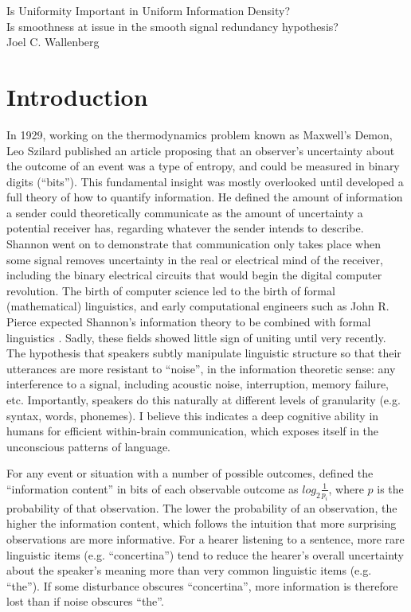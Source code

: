 \documentclass[12pt]{article}
\begin{document}
\noindent Is Uniformity Important in Uniform Information Density?\\
Is smoothness at issue in the smooth signal redundancy hypothesis?\\
\noindent Joel C. Wallenberg\\

\section{Introduction}

\nocite{shannon1948reprint}
In 1929, working on the thermodynamics problem known as Maxwell's Demon, Leo Szilard published an article proposing that an observer's uncertainty about the outcome of an event was a type of entropy, and could be measured in binary digits (``bits''). This fundamental insight was mostly overlooked until \citet{shannon1948} developed a full theory of how to quantify information. He defined the amount of information a sender could theoretically communicate as the amount of uncertainty a potential receiver has, regarding whatever the sender intends to describe. Shannon went on to demonstrate that communication only takes place when some signal removes uncertainty in the real or electrical mind of the receiver, including the binary electrical circuits that would begin the digital computer revolution. The birth of computer science led to the birth of formal (mathematical) linguistics, and early computational engineers such as John R. Pierce expected Shannon's information theory to be combined with formal linguistics \citet{pierce1980}. Sadly, these fields showed little sign of uniting until very recently. The hypothesis that speakers subtly manipulate linguistic structure so that their utterances are more resistant to ``noise'', in the information theoretic sense: any interference to a signal, including acoustic noise, interruption, memory failure, etc. Importantly, speakers do this naturally at different levels of granularity (e.g. syntax, words, phonemes). I believe this indicates a deep cognitive ability in humans for efficient within-brain communication, which exposes itself in the unconscious patterns of language.

For any event or situation with a number of possible outcomes, \citet{shannon1948} defined the ``information content'' in bits of each observable outcome as $log_2 \frac{1}{p_i}$, where $p$ is the probability of that observation. The lower the probability of an observation, the higher the information content, which follows the intuition that more surprising observations are more informative. For a hearer listening to a sentence, more rare linguistic items (e.g. ``concertina'') tend to reduce the hearer's overall uncertainty about the speaker's meaning more than very common linguistic items (e.g. ``the''). If some disturbance obscures ``concertina'', more information is therefore lost than if noise obscures ``the''.
\end{document}
